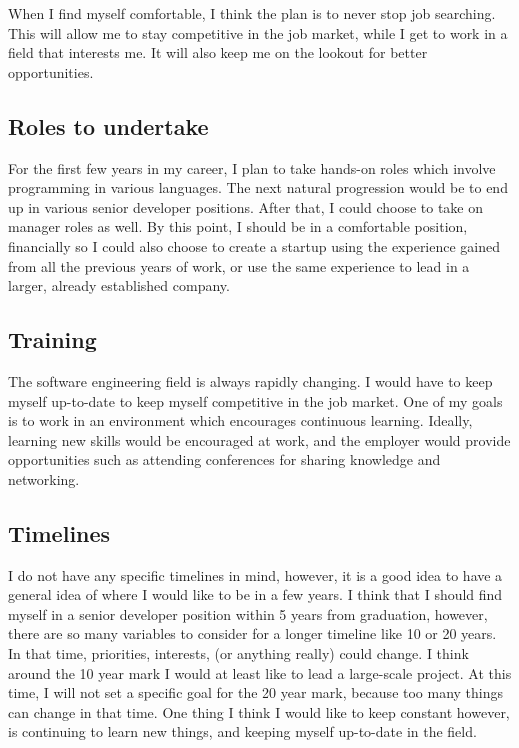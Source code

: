 When I find myself comfortable, I think the plan is to never stop job searching.
This will allow me to stay competitive in the job market\cite{kleiman_2015},
while I get to work in a field that interests me. It will also keep me on the
lookout for better opportunities.


\subsection{Roles to undertake}
For the first few years in my career, I plan to take hands-on roles which
involve programming in various languages. The next natural progression would be
to end up in various senior developer positions. After that, I could choose to
take on manager roles as well. By this point, I should be in a comfortable
position, financially so I could also choose to create a startup using the
experience gained from all the previous years of work, or use the same
experience to lead in a larger, already established company.

\subsection{Training}
The software engineering field is always rapidly changing. I would have to keep
myself up-to-date to keep myself competitive in the job market. One of my goals
is to work in an environment which encourages continuous learning. Ideally,
learning new skills would be encouraged at work, and the employer would provide
opportunities such as attending conferences for sharing knowledge and
networking. 

\subsection{Timelines}
I do not have any specific timelines in mind, however, it is a good idea to have
a general idea of where I would like to be in a few years. I think that I
should find myself in a senior developer position within 5 years from
graduation, however, there are so many variables to consider for a longer
timeline like 10 or 20 years. In that time, priorities, interests, (or anything
really) could change. I think around the 10 year mark I would at least like to
lead a large-scale project. At this time, I will not set a specific goal for the
20 year mark, because too many things can change in that time. One thing I think
I would like to keep constant however, is continuing to learn new things, and
keeping myself up-to-date in the field. 

